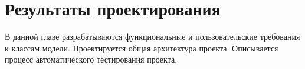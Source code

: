 \chapter{Результаты проектирования}

\begin{annotation}
	В данной главе разрабатываются функциональные и пользовательские требования к классам модели.
	Проектируется общая архитектура проекта.
	Описывается процесс автоматического тестирования проекта.
\end{annotation}











